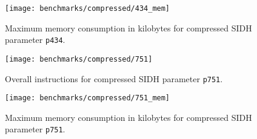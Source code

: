 \begin{figure}[H]
  \centering
  \texttt{[image: benchmarks/compressed/434\_mem]}
  \caption[Maximum memory consumption compressed p434]
  {Maximum memory consumption in kilobytes for compressed \gls{SIDH} parameter \texttt{p434}.}
  \label{fig:results_comp_434_mem}
\end{figure}

\begin{figure}[H]
  \centering
  \texttt{[image: benchmarks/compressed/751]}
  \caption[Overall instructions compressed p751]
  {Overall instructions for compressed \gls{SIDH} parameter \texttt{p751}.}
  \label{fig:results_comp_751}
\end{figure}

\begin{figure}[H]
  \centering
  \texttt{[image: benchmarks/compressed/751\_mem]}
  \caption[Maximum memory consumption compressed p751]
  {Maximum memory consumption in kilobytes for compressed \gls{SIDH} parameter \texttt{p751}.}
  \label{fig:results_comp_751_mem}
\end{figure}


